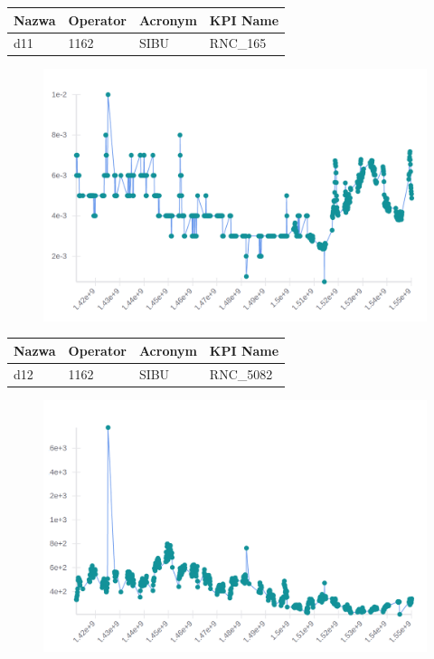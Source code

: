 \documentclass[eng,printmode]{mgr}
\begin{document}
\begingroup
\fontsize{10pt}{12pt}\selectfont
\begin{tabu} to 0.9\textwidth { | X[l] | X[l] | X[l] | X[l] |}
\hline
\textbf{Nazwa} & \textbf{Operator} & \textbf{Acronym} & \textbf{KPI Name} \\
\hline
d11 & 1162 & SIBU & RNC\_165 \\
\hline
\end{tabu}
\endgroup

\begin{figure}[H]
  \begin{center}
  \includegraphics[scale=0.53]{d11}
  \end{center}
\end{figure}
\newpage

\begingroup
\fontsize{10pt}{12pt}\selectfont
\begin{tabu} to 0.9\textwidth { | X[l] | X[l] | X[l] | X[l] |}
\hline
\textbf{Nazwa} & \textbf{Operator} & \textbf{Acronym} & \textbf{KPI Name} \\
\hline
d12 & 1162 & SIBU & RNC\_5082 \\
\hline
\end{tabu}
\endgroup

\begin{figure}[H]
  \begin{center}
  \includegraphics[scale=0.4]{d12}
  \end{center}
\end{figure}
\newpage
\end{document}

